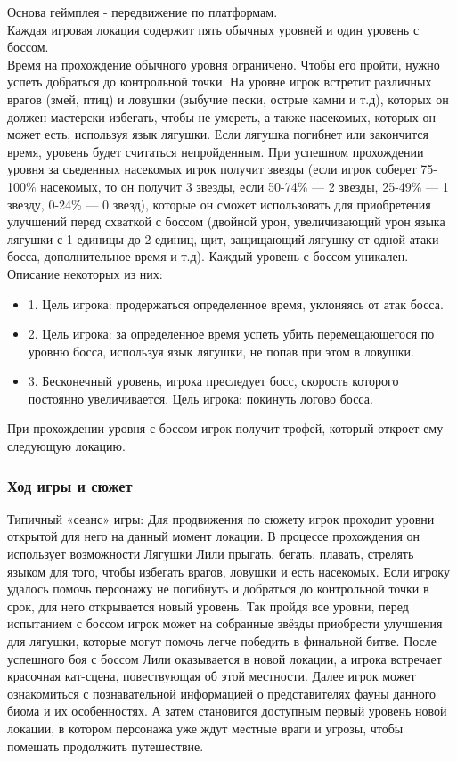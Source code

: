 \documentclass{article}
\begin{document}
Основа геймплея - передвижение по платформам. \\
Каждая игровая локация содержит пять обычных уровней и один уровень с боссом. \\
Время на прохождение обычного уровня ограничено. Чтобы его пройти, нужно успеть добраться до контрольной точки. На уровне игрок встретит различных врагов (змей, птиц) и ловушки (зыбучие пески, острые камни и т.д), которых он должен мастерски избегать, чтобы не умереть, а также насекомых, которых он может есть, используя язык лягушки. Если лягушка погибнет или закончится время, уровень будет считаться непройденным. При успешном прохождении уровня за съеденных насекомых игрок получит звезды (если игрок соберет 75-100\% насекомых, то он получит 3 звезды, если 50-74\% — 2 звезды, 25-49\% — 1 звезду, 0-24\% — 0 звезд), которые он сможет использовать для приобретения улучшений перед схваткой с боссом (двойной урон, увеличивающий урон языка лягушки с 1 единицы до 2 единиц, щит, защищающий лягушку от одной атаки босса, дополнительное время и т.д).
Каждый уровень с боссом уникален. Описание некоторых из них:
\begin{itemize}
    \item 1. Цель игрока: продержаться определенное время, уклоняясь от атак босса.
    \item 2. Цель игрока: за определенное время успеть убить перемещающегося по уровню босса, используя язык лягушки, не попав при этом в ловушки.
    \item 3. Бесконечный уровень, игрока преследует босс, скорость которого постоянно увеличивается. Цель игрока: покинуть логово босса.
\end{itemize}

При прохождении уровня с боссом игрок получит трофей, который откроет ему следующую локацию.

\subsubsection{Ход игры и сюжет}

Типичный «сеанс» игры: Для продвижения по сюжету игрок проходит уровни открытой для него на данный момент локации. В процессе прохождения он использует возможности Лягушки Лили прыгать, бегать, плавать, стрелять языком для того, чтобы избегать врагов, ловушки и есть насекомых. Если игроку удалось помочь персонажу не погибнуть и добраться до контрольной точки в срок, для него открывается новый уровень. Так пройдя все уровни, перед испытанием с боссом игрок может на собранные звёзды приобрести улучшения для лягушки, которые могут помочь легче победить в финальной битве. После успешного боя с боссом Лили оказывается в новой локации, а игрока встречает красочная кат-сцена, повествующая об этой местности. Далее игрок может ознакомиться с познавательной информацией о представителях фауны данного биома и их особенностях. А затем становится доступным первый уровень новой локации, в котором персонажа уже ждут местные враги и угрозы, чтобы помешать продолжить путешествие.
\end{document}
